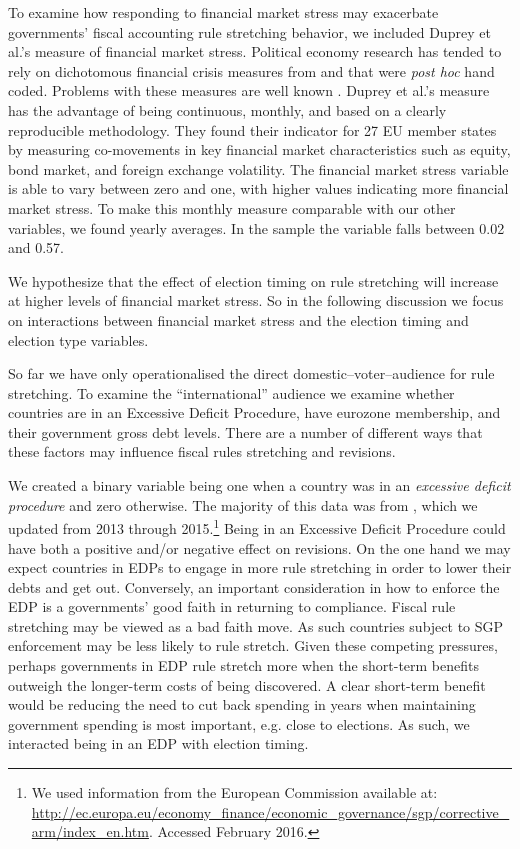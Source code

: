 \documentclass[]{article}
\begin{document}
To examine how responding to financial market stress may exacerbate governments' fiscal accounting rule stretching behavior, we included Duprey et al.'s \citeyearpar{ThibautDuprey2015} measure of financial market stress. Political economy research has tended to rely on dichotomous financial crisis measures from \cite{Laeven2012} and \cite{ReinhartRog2010} that were \emph{post hoc} hand coded. Problems with these measures are well known \citep[see][]{finstress_paper}. Duprey et al.'s measure has the advantage of being continuous, monthly, and based on a clearly reproducible methodology. They found their indicator for 27 EU member states by measuring co-movements in key financial market characteristics such as equity, bond market, and foreign exchange volatility. The financial market stress variable is able to vary between zero and one, with higher values indicating more financial market stress. To make this monthly measure comparable with our other variables, we found yearly averages. In the sample the variable falls between 0.02 and 0.57.

We hypothesize that the effect of election timing on rule stretching will increase at higher levels of financial market stress. So in the following discussion we focus on interactions between financial market stress and the election timing and election type variables.

So far we have only operationalised the direct domestic--voter--audience for rule stretching. To examine the ``international'' audience we examine whether countries are in an Excessive Deficit Procedure, have eurozone membership, and their government gross debt levels. There are a number of different ways that these factors may influence fiscal rules stretching and revisions.

We created a binary variable being one when a country was in an \emph{excessive deficit procedure} and zero otherwise. The majority of this data was from \cite{baergHallerberg2016}, which we updated from 2013 through 2015.\footnote{We used information from the European Commission available at: \url{http://ec.europa.eu/economy_finance/economic_governance/sgp/corrective_arm/index_en.htm}. Accessed February 2016.}  Being in an Excessive Deficit Procedure could have both a positive and/or negative effect on revisions. On the one hand we may expect countries in EDPs to engage in more rule stretching in order to lower their debts and get out. Conversely, an important consideration in how to enforce the EDP is a governments' good faith in returning to compliance. Fiscal rule stretching may be viewed as a bad faith move. As such countries subject to SGP enforcement may be less likely to rule stretch. Given these competing pressures, perhaps governments in EDP rule stretch more when the short-term benefits outweigh the longer-term costs of being discovered. A clear short-term benefit would be reducing the need to cut back spending in years when maintaining government spending is most important, e.g. close to elections. As such, we interacted being in an EDP with election timing.
\end{document}
